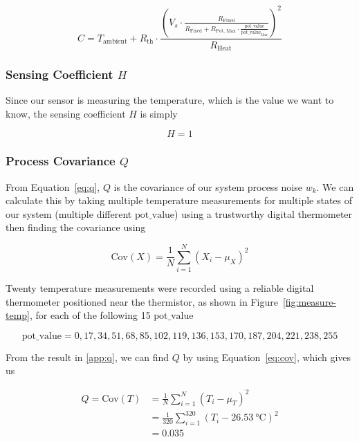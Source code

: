 \documentclass[12pt,a4paper]{article}
\begin{document}
\begin{equation*}
    C = T_{\text{ambient}} + R_{\text{th}} \cdot \frac{\left(V_s \cdot \frac{R_{\text{Fixed}}}{R_{\text{Fixed}} + R_{\text{Pot, Max}} \cdot \frac{\text{pot\_value}}{\text{pot\_value}_{\text{Max}}}}\right)^2}{R_{\text{Heat}}}
\end{equation*}

\subsubsection{Sensing Coefficient $H$}
Since our sensor is measuring the temperature, which is the value we want to know, the sensing coefficient $H$ is simply

\begin{equation*}
    H = 1
\end{equation*}

\subsubsection{Process Covariance $Q$}
From Equation~\eqref{eq:q}, $Q$ is the covariance of our system process noise $w_k$. We can calculate this by taking multiple temperature measurements for multiple states of our system (multiple different $\text{pot\_value}$) using a trustworthy digital thermometer then finding the covariance using

\begin{equation}
    \label{eq:cov}
    \mathrm{Cov}(X) = \frac{1}{N} \sum_{i=1}^{N} (X_i - \mu_X)^2
\end{equation}

Twenty temperature measurements were recorded using a reliable digital thermometer positioned near the thermistor, as shown in Figure~\ref{fig:measure-temp}, for each of the following 15 $\text{pot\_value}$

\begin{equation}
    \label{eq:pot-value}
    \text{pot\_value} = 0, 17, 34, 51, 68, 85, 102, 119, 136, 153, 170, 187, 204, 221, 238, 255
\end{equation}

From the result in \ref{app:q}, we can find $Q$ by using Equation~\eqref{eq:cov}, which gives us

\begin{align*}
    Q = \mathrm{Cov}(T) &= \frac{1}{N} \sum_{i=1}^{N} (T_i - \mu_T)^2 \\
    &= \frac{1}{320} \sum_{i=1}^{320} (T_i - \SI{26.53}{\degreeCelsius})^2 \\
    &= 0.035
\end{align*}
\end{document}
